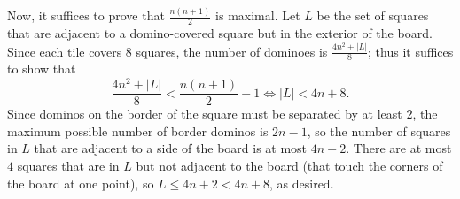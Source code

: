 Now, it suffices to prove that $\tfrac{n(n+1)}2$ is maximal. Let $L$ be the set of squares that are adjacent to a domino-covered square but in the exterior of the board. Since each tile covers $8$ squares, the number of dominoes is $\tfrac{4n^2+|L|}8$; thus it suffices to show that $$\frac{4n^2+|L|}8<\frac{n(n+1)}2+1\iff |L|<4n+8.$$
Since dominos on the border of the square must be separated by at least $2$, the maximum possible number of border dominos is $2n-1$, so the number of squares in $L$ that are adjacent to a side of the board is at most $4n-2$. There are at most $4$ squares that are in $L$ but not adjacent to the board (that touch the corners of the board at one point), so $L\le 4n+2<4n+8$, as desired.
